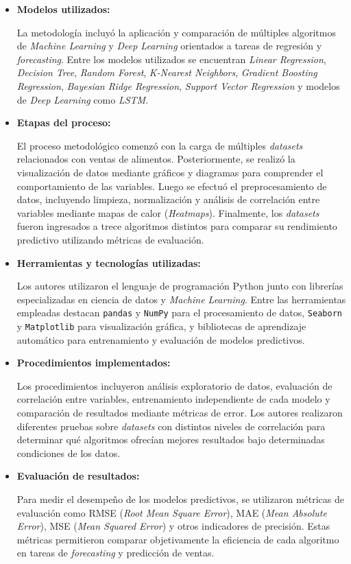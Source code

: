 \begin{itemize}

    \item \textbf{Modelos utilizados:}

    La metodología incluyó la aplicación y comparación de múltiples algoritmos de \textit{Machine Learning} y \textit{Deep Learning} orientados a tareas de regresión y \textit{forecasting}. Entre los modelos utilizados se encuentran \textit{Linear Regression}, \textit{Decision Tree}, \textit{Random Forest}, \textit{K-Nearest Neighbors}, \textit{Gradient Boosting Regression}, \textit{Bayesian Ridge Regression}, \textit{Support Vector Regression} y modelos de \textit{Deep Learning} como \textit{LSTM}.

    \item \textbf{Etapas del proceso:}

    El proceso metodológico comenzó con la carga de múltiples \textit{datasets} relacionados con ventas de alimentos. Posteriormente, se realizó la visualización de datos mediante gráficos y diagramas para comprender el comportamiento de las variables. Luego se efectuó el preprocesamiento de datos, incluyendo limpieza, normalización y análisis de correlación entre variables mediante mapas de calor (\textit{Heatmaps}). Finalmente, los \textit{datasets} fueron ingresados a trece algoritmos distintos para comparar su rendimiento predictivo utilizando métricas de evaluación.

    \item \textbf{Herramientas y tecnologías utilizadas:}

    Los autores utilizaron el lenguaje de programación Python junto con librerías especializadas en ciencia de datos y \textit{Machine Learning}. Entre las herramientas empleadas destacan \texttt{pandas} y \texttt{NumPy} para el procesamiento de datos, \texttt{Seaborn} y \texttt{Matplotlib} para visualización gráfica, y bibliotecas de aprendizaje automático para entrenamiento y evaluación de modelos predictivos.

    \item \textbf{Procedimientos implementados:}

    Los procedimientos incluyeron análisis exploratorio de datos, evaluación de correlación entre variables, entrenamiento independiente de cada modelo y comparación de resultados mediante métricas de error. Los autores realizaron diferentes pruebas sobre \textit{datasets} con distintos niveles de correlación para determinar qué algoritmos ofrecían mejores resultados bajo determinadas condiciones de los datos.

    \item \textbf{Evaluación de resultados:}

    Para medir el desempeño de los modelos predictivos, se utilizaron métricas de evaluación como RMSE (\textit{Root Mean Square Error}), MAE (\textit{Mean Absolute Error}), MSE (\textit{Mean Squared Error}) y otros indicadores de precisión. Estas métricas permitieron comparar objetivamente la eficiencia de cada algoritmo en tareas de \textit{forecasting} y predicción de ventas.

\end{itemize}

